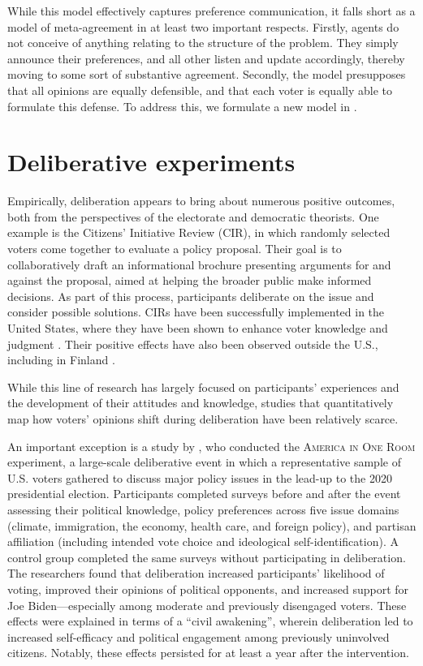 While this model effectively captures preference communication, it falls short
as a model of meta-agreement in at least two important respects. Firstly,
agents do not conceive of anything relating to the structure of the problem.
They simply announce their preferences, and all other listen and update
accordingly, thereby moving to some sort of substantive agreement. Secondly,
the model presupposes that all opinions are equally defensible, and that each
voter is equally able to formulate this defense. To address this, we formulate a
new model in .


\section{Deliberative experiments}


Empirically, deliberation appears to bring about numerous positive outcomes,
both from the perspectives of the electorate and democratic theorists. One
example is the Citizens' Initiative Review (CIR), in which randomly selected
voters come together to evaluate a policy proposal. Their goal is to
collaboratively draft an informational brochure presenting arguments for and
against the proposal, aimed at helping the broader public make informed
decisions. As part of this process, participants deliberate on the issue and
consider possible solutions. CIRs have been successfully implemented in the
United States, where they have been shown to enhance voter knowledge and
judgment \cite{gastilHopeDemocracyHow2020}. Their positive effects have also
been observed outside the U.S., including in Finland
\cite{setalaDeliberativeMinipublicsFacilitating2023}.

While this line of research has largely focused on participants’ experiences
and the development of their attitudes and knowledge, studies that
quantitatively map how voters’ opinions shift during deliberation have been
relatively scarce.

An important exception is a study by \citet{fishkinCanDeliberationHave2024}, who conducted
the \textsc{America in One Room} experiment, a large-scale deliberative event in which a
representative sample of U.S. voters gathered to discuss major policy issues in
the lead-up to the 2020 presidential election. Participants completed surveys
before and after the event assessing their political knowledge, policy
preferences across five issue domains (climate, immigration, the economy,
health care, and foreign policy), and partisan affiliation (including intended
vote choice and ideological self-identification). A control group completed the
same surveys without participating in deliberation. The researchers found that
deliberation increased participants’ likelihood of voting, improved their
opinions of political opponents, and increased support for Joe Biden—especially
among moderate and previously disengaged voters. These effects were explained
in terms of a ``civil awakening'', wherein deliberation led to increased
self-efficacy and political engagement among previously uninvolved citizens.
Notably, these effects persisted for at least a year after the intervention.

